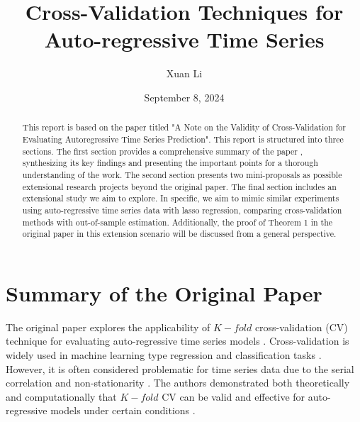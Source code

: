 \documentclass[12pt, oneside]{amsart}
\title{Cross-Validation Techniques for Auto-regressive Time Series}
\author{Xuan Li}
\date{September 8, 2024}
\theoremstyle{definition}
\theoremstyle{remark}
\numberwithin{equation}{section}
\begin{document}
\begin{abstract}
    This report is based on the paper titled "A Note on the Validity of Cross-Validation for Evaluating Autoregressive Time Series Prediction"\citep{Bergmeir2018}. This report is structured into three sections. The first section provides a comprehensive summary of the paper \citep{Bergmeir2018}, synthesizing its key findings and presenting the important points for a thorough understanding of the work. The second section presents two mini-proposals as possible extensional research projects beyond the original paper. The final section includes an extensional study we aim to explore. In specific, we aim to mimic similar experiments using auto-regressive time series data with lasso regression, comparing cross-validation methods with out-of-sample estimation. Additionally, the proof of Theorem 1 in the original paper in this extension scenario will be discussed from a general perspective.
\end{abstract}
\maketitle
\tableofcontents


\section{Summary of the Original Paper}
The original paper explores the applicability of $K-fold$ cross-validation (CV) technique for evaluating auto-regressive time series models \citep{Bergmeir2018}. Cross-validation is widely used in machine learning type regression and classification tasks \citep{Hastie}. However, it is often considered problematic for time series data due to the serial correlation and non-stationarity \citep{Bergmeir2012}.  The authors demonstrated both theoretically and computationally that $K-fold$ CV can be valid and effective for auto-regressive models under certain conditions \citep{Bergmeir2018}.
\\
\end{document}
